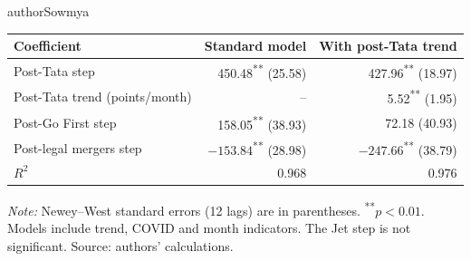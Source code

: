 \begin{mergedcontribution}{authorSowmya}
\label{app:o1-wedge}

\begin{minipage}{\linewidth}
\label{tab:o1-gap}
\centering
{\small{}\setlength{\tabcolsep}{5pt}
\fontsize{10}{12}\selectfont{}\setlength{\tabcolsep}{3pt}
\renewcommand{\arraystretch}{1.15}
\begin{tabular}{|l|r|r|}
\hline
\textbf{Coefficient} & \textbf{Standard model} & \textbf{With post-Tata trend} \\
\hline
Post-Tata step & 450.48\textsuperscript{**} (25.58) & 427.96\textsuperscript{**} (18.97) \\
\hline
Post-Tata trend (points/month) & -- & 5.52\textsuperscript{**} (1.95) \\
\hline
Post-Go First step & 158.05\textsuperscript{**} (38.93) & 72.18 (40.93) \\
\hline
Post-legal mergers step & $-153.84$\textsuperscript{**} (28.98) & $-247.66$\textsuperscript{**} (38.79) \\
\hline
$R^2$ & 0.968 & 0.976 \\
\hline
\end{tabular}\par}
\vspace{4pt}
{\footnotesize{}\raggedright\textit{Note:} Newey--West standard errors (12 lags) are in parentheses. \textsuperscript{**}$p<0.01$. Models include trend, COVID and month indicators. The Jet step is not significant. Source: authors' calculations.\par}
\end{minipage}

\end{mergedcontribution}

